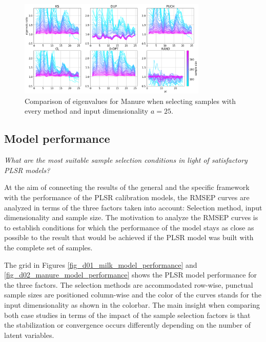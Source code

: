 \documentclass[journal=ancham,manuscript=article]{achemso}
\begin{document}
\begin{figure}[b]
\includegraphics[width=0.8\textwidth]{manuscript/figures/d02_manure_specific_framework_eigenvalsratio.png}
\centering
\caption{Comparison of eigenvalues for Manure when selecting samples with every method and input dimensionality $a=25$.}
\label{fig_d02_manure_specific_framework_eigenvalsratio}
\end{figure}

\subsection*{Model performance}\label{results:modperformance}


\emph{What are the most suitable sample selection conditions in light of satisfactory PLSR models?}

At the aim of connecting the results of the general and the specific framework with the performance of the PLSR calibration models, the RMSEP curves are analyzed in terms of the three factors taken into account: Selection method, input dimensionality and sample size. The motivation to analyze the RMSEP curves is to establish conditions for which the performance of the model stays as close as possible to the result that would be achieved if the PLSR model was built with the complete set of samples. 

The grid in Figures \ref{fig_d01_milk_model_performance} and \ref{fig_d02_manure_model_performance} shows the PLSR model performance for the three factors. The selection methods are accommodated row-wise, punctual sample sizes are positioned column-wise and the color of the curves stands for the input dimensionality as shown in the colorbar. The main insight when comparing both case studies in terms of the impact of the sample selection factors is that the stabilization or convergence occurs differently depending on the number of latent variables. 
\end{document}
